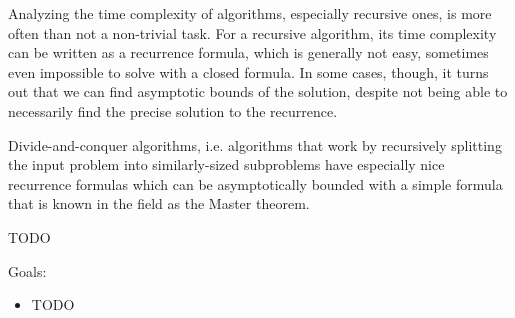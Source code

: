 Analyzing the time complexity of algorithms, especially recursive ones, is more often than not 
a non-trivial task. For a recursive algorithm, its time complexity can be written as a recurrence
formula, which is generally not easy, sometimes even impossible to solve with a closed formula.
In some cases, though, it turns out that we can find asymptotic bounds of the solution, despite not
being able to necessarily find the precise solution to the recurrence.

Divide-and-conquer algorithms, i.e. algorithms that work by recursively splitting the input problem
into similarly-sized subproblems have especially nice recurrence formulas which can be asymptotically
bounded with a simple formula that is known in the field as the Master theorem.

\begin{theorem}
TODO
\end{theorem}

Goals:
\begin{itemize}
\item TODO
\end{itemize}
